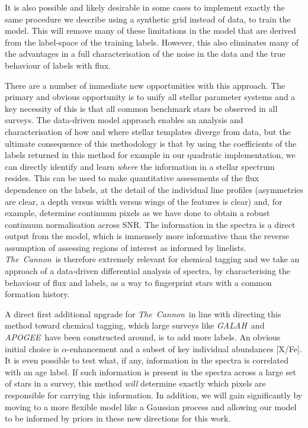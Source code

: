 \documentclass[12pt, preprint]{aastex}
\newcommand{\tc}{\textsl{The~Cannon}}
\newcommand{\apogee}{\textsl{APOGEE}}
\newcommand{\galah}{\textsl{GALAH}}
\begin{document}
 It is also possible and likely desirable in some cases to implement exactly the same procedure we describe using a synthetic grid instead of data, to train the model. This will remove many of these limitations in the model that are derived from the label-space of the training labels. However, this also eliminates many of the advantages in a full characterisation of the noise in the data and the true behaviour of labels with flux.%
 


There are a number of immediate new opportunities with this approach. The primary and obvious opportunity is to unify all stellar parameter systems and a key necessity of this is that all common benchmark stars be observed in all surveys. The data-driven model approach enables an analysis and characterisation of how and where stellar templates diverge from data, but the ultimate consequence of this methodology is that by using the coefficients of the labels returned in this method for example in our quadratic implementation, we can directly identify and learn \textit{where} the information in a stellar spectrum resides. This can be used to make quantitative assessments of the flux dependence on the labels, at the detail of the individual line profiles (asymmetries are clear, a depth versus width versus wings of the features is clear) and, for example, determine continuum pixels as we have done to obtain a robust continuum normalisation across SNR. The information in the spectra  is a direct output from the model, which is immensely more informative than the reverse assumption of assessing regions of interest as informed by linelists.  \tc\ is therefore extremely relevant for chemical tagging and we take an approach of a data-driven differential analysis of spectra, by characterising the behaviour of flux and labels, as a way to fingerprint stars with a common formation history.

A direct first additional upgrade for \tc\ in line with directing this method toward chemical tagging, which large surveys like \galah\ and \apogee\ have been constructed around,  is  to add more labels. An obvious initial choice is $\alpha$-enhancement and a subset of key individual abundances [X/Fe]. It is even possible to test what, if any, information in the spectra is correlated with an age label. If such information is present in the spectra across a large set of stars in a survey, this method \textit{will} determine exactly which pixels are responsible for carrying this information. In addition, we will gain significantly by moving to a more flexible model like a Gaussian process and allowing our model to be informed by priors in these new directions for this work. 
\end{document}
